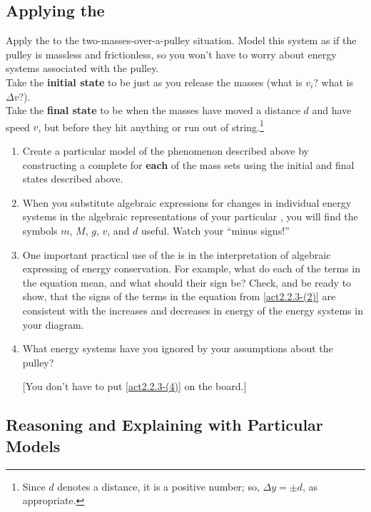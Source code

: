 \subsection{Applying the \EnergyInteractionModel{}}
\label{act2.2.3-2}

Apply the \EnergyInteractionModel{} to the two-masses-over-a-pulley situation. Model this system as if the pulley is massless and frictionless, so you won't have to worry about energy systems associated with the pulley.\\

\noindent Take the \textbf{initial state} to be just as you release the masses (what is $v_i$? what is $\Delta v$?).\\

\noindent Take the \textbf{final state} to be when the masses have moved a distance $d$ and have speed $v$, but before they hit anything or run out of string.\footnote{Since $d$ denotes a distance, it is a positive number; so, $\Delta y = \pm d$, as appropriate.}

\begin{enumerate}
	\item Create a particular model of the phenomenon described above by constructing a complete \EnergyDiagram{} for \textbf{each} of the mass sets using the initial and final states described above.
	\item	\label{act2.2.3-(2)} When you substitute algebraic expressions for changes in individual energy systems in the algebraic representations of your particular \EnergyInteractionModels{}, you will find the symbols $m$, $M$, $g$, $v$, and $d$ useful. Watch your ``minus signs!''
	\item One important practical use of the \EnergyDiagram{} is in the interpretation of algebraic expressing of energy conservation. For example, what do each of the terms in the equation mean, and what should their sign be? Check, and be ready to show, that the signs of the terms in the equation from \eqref{act2.2.3-(2)} are consistent with the increases and decreases in energy of the energy systems in your diagram.
	\item\label{act2.2.3-(4)} What energy systems have you ignored by your assumptions about the pulley?
	
	[You don't have to put \eqref{act2.2.3-(4)} on the board.]
	
\WCD  
\end{enumerate}
 
\subsection{Reasoning and Explaining with Particular Models}
\label{act2.2.3-3}

